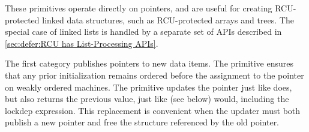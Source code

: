 These primitives operate directly on pointers, and are useful for
creating RCU-protected linked data structures, such as RCU-protected
arrays and trees.
The special case of linked lists is handled by a separate set of
APIs described in
\cref{sec:defer:RCU has List-Processing APIs}.

The first category publishes pointers to new data items.
The  primitive ensures that any
prior initialization remains ordered before the assignment to the
pointer on weakly ordered machines.
The  primitive updates the pointer just like
 does, but also returns the previous value,
just like  (see below) would, including
the lockdep expression.
This replacement is convenient when the updater must both publish a new
pointer and free the structure referenced by the old pointer.

